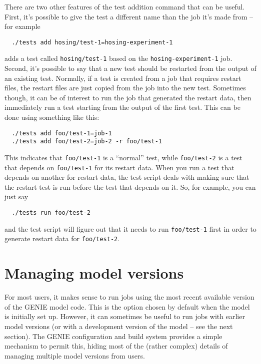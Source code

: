 \documentclass[a4paper,10pt,article]{memoir}
\begin{document}
There are two other features of the test addition command that can be
useful.  First, it's possible to give the test a different name than
the job it's made from -- for example
\begin{verbatim}
  ./tests add hosing/test-1=hosing-experiment-1
\end{verbatim}
adds a test called \texttt{hosing/test-1} based on the
\texttt{hosing-experiment-1} job.  Second, it's possible to say that a
new test should be restarted from the output of an existing test.
Normally, if a test is created from a job that requires restart files,
the restart files are just copied from the job into the new test.
Sometimes though, it can be of interest to run the job that generated
the restart data, then immediately run a test starting from the output
of the first test.  This can be done using something like this:
\begin{verbatim}
  ./tests add foo/test-1=job-1
  ./tests add foo/test-2=job-2 -r foo/test-1
\end{verbatim}
This indicates that \texttt{foo/test-1} is a ``normal'' test, while
\texttt{foo/test-2} is a test that depends on \texttt{foo/test-1} for
its restart data.  When you run a test that depends on another for
restart data, the test script deals with making sure that the restart
test is run before the test that depends on it.  So, for example, you
can just say
\begin{verbatim}
  ./tests run foo/test-2
\end{verbatim}
and the test script will figure out that it needs to run
\texttt{foo/test-1} first in order to generate restart data for
\texttt{foo/test-2}.

\section{Managing model versions}

For most users, it makes sense to run jobs using the most recent
available version of the GENIE model code.  This is the option chosen
by default when the model is initially set up.  However, it can
sometimes be useful to run jobs with earlier model versions (or with a
development version of the model -- see the next section).  The GENIE
configuration and build system provides a simple mechanism to permit
this, hiding most of the (rather complex) details of managing multiple
model versions from users.
\end{document}
